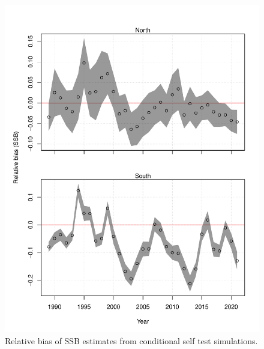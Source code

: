 \documentclass[
]{article}
\begin{document}
\begin{figure}

{\centering \includegraphics{bsb_models_wp_files/figure-latex/self-test-res-2-1} 

}

\caption{Relative bias of SSB estimates from conditional self test simulations.}\label{fig:self-test-res-2}
\end{figure}
\end{document}
